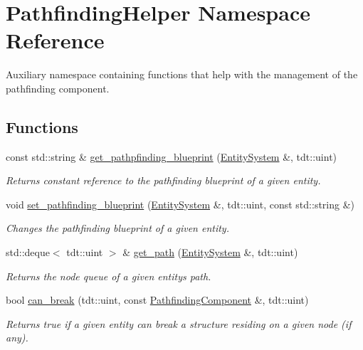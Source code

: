 \hypertarget{namespace_pathfinding_helper}{}\section{Pathfinding\+Helper Namespace Reference}
\label{namespace_pathfinding_helper}


Auxiliary namespace containing functions that help with the management of the pathfinding component.  


\subsection*{Functions}
\begin{DoxyCompactItemize}
\item 
const std\+::string \& \hyperlink{namespace_pathfinding_helper_ad343549c9a1f641509984e2cf76b90b0}{get\+\_\+pathpfinding\+\_\+blueprint} (\hyperlink{class_entity_system}{Entity\+System} \&, tdt\+::uint)
\begin{DoxyCompactList}\small\item\em Returns constant reference to the pathfinding blueprint of a given entity. \end{DoxyCompactList}\item 
void \hyperlink{namespace_pathfinding_helper_a8375593acee0756c392ad5a6f8f1de5a}{set\+\_\+pathfinding\+\_\+blueprint} (\hyperlink{class_entity_system}{Entity\+System} \&, tdt\+::uint, const std\+::string \&)
\begin{DoxyCompactList}\small\item\em Changes the pathfinding blueprint of a given entity. \end{DoxyCompactList}\item 
std\+::deque$<$ tdt\+::uint $>$ \& \hyperlink{namespace_pathfinding_helper_a03da1c07c3d0acfd48aeb1b16a146645}{get\+\_\+path} (\hyperlink{class_entity_system}{Entity\+System} \&, tdt\+::uint)
\begin{DoxyCompactList}\small\item\em Returns the node queue of a given entity\textquotesingle{}s path. \end{DoxyCompactList}\item 
bool \hyperlink{namespace_pathfinding_helper_aa0badf7dfa994fb33ebceacd615db253}{can\+\_\+break} (tdt\+::uint, const \hyperlink{struct_pathfinding_component}{Pathfinding\+Component} \&, tdt\+::uint)
\begin{DoxyCompactList}\small\item\em Returns true if a given entity can break a structure residing on a given node (if any). \end{DoxyCompactList}\item 

\end{DoxyCompactItemize}

